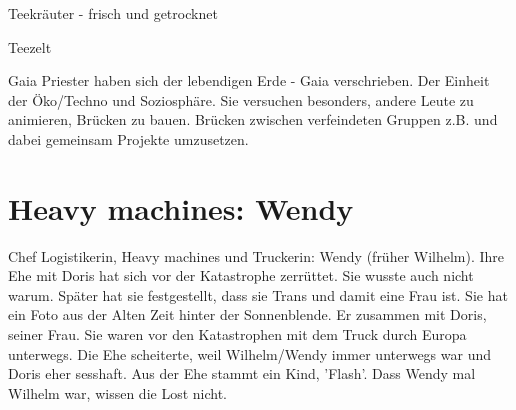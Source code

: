 \begin{npcBox}[title=Laura, Gaianistin]
    \begin{stressSection}
    \end{stressSection}
    \begin{tabularx}{\textwidth}{ XX }
    \end{tabularx}

    \begin{consequences}
    \item {}
    \item {}
    \item {}
    \end{consequences}

    \begin{equipment}
    \item Teekräuter - frisch und getrocknet
    \item Teezelt
    \end{equipment}
\end{npcBox}


Gaia Priester haben sich der lebendigen Erde - Gaia verschrieben. Der Einheit der Öko/Techno und Soziosphäre. Sie versuchen besonders, andere Leute zu animieren, Brücken zu bauen. Brücken zwischen verfeindeten Gruppen z.B. und dabei gemeinsam Projekte umzusetzen.

\newpage


\section{Heavy machines: Wendy}

Chef Logistikerin, Heavy machines und Truckerin: Wendy (früher Wilhelm). Ihre Ehe mit Doris hat sich vor der Katastrophe zerrüttet. Sie wusste auch nicht warum. Später hat sie festgestellt, dass sie Trans und damit eine Frau ist. Sie hat ein Foto aus der Alten Zeit hinter der Sonnenblende. Er zusammen mit Doris, seiner Frau. Sie waren vor den Katastrophen mit dem Truck durch Europa unterwegs. Die Ehe scheiterte, weil Wilhelm/Wendy immer unterwegs war und Doris eher sesshaft. Aus der Ehe stammt ein Kind, 'Flash'. Dass Wendy mal Wilhelm war, wissen die Lost nicht.

